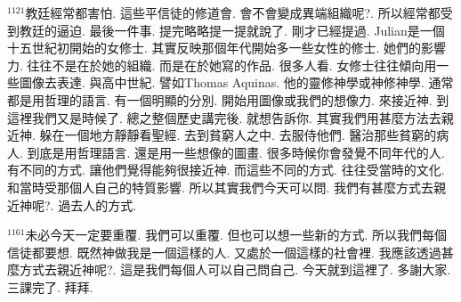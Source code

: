 \documentclass{book}
\begin{document}
$^{1121}$教廷經常都害怕.
這些平信徒的修道會.
會不會變成異端組織呢?.
所以經常都受到教廷的逼迫.
最後一件事.
提完略略提一提就說了.
剛才已經提過.
Julian是一個十五世紀初開始的女修士.
其實反映那個年代開始多一些女性的修士.
她們的影響力.
往往不是在於她的組織.
而是在於她寫的作品.
很多人看.
女修士往往傾向用一些圖像去表達.
與高中世紀.
譬如Thomas Aquinas.
他的靈修神學或神修神學.
通常都是用哲理的語言.
有一個明顯的分別.
開始用圖像或我們的想像力.
來接近神.
到這裡我們又是時候了.
總之整個歷史講完後.
就想告訴你.
其實我們用甚麼方法去親近神.
躲在一個地方靜靜看聖經.
去到貧窮人之中.
去服侍他們.
醫治那些貧窮的病人.
到底是用哲理語言.
還是用一些想像的圖畫.
很多時候你會發覺不同年代的人.
有不同的方式.
讓他們覺得能夠很接近神.
而這些不同的方式.
往往受當時的文化.
和當時受那個人自己的特質影響.
所以其實我們今天可以問.
我們有甚麼方式去親近神呢?.
過去人的方式.

$^{1161}$未必今天一定要重覆.
我們可以重覆.
但也可以想一些新的方式.
所以我們每個信徒都要想.
既然神做我是一個這樣的人.
又處於一個這樣的社會裡.
我應該透過甚麼方式去親近神呢?.
這是我們每個人可以自己問自己.
今天就到這裡了.
多謝大家.
三課完了.
拜拜.
\newpage
\end{document}
